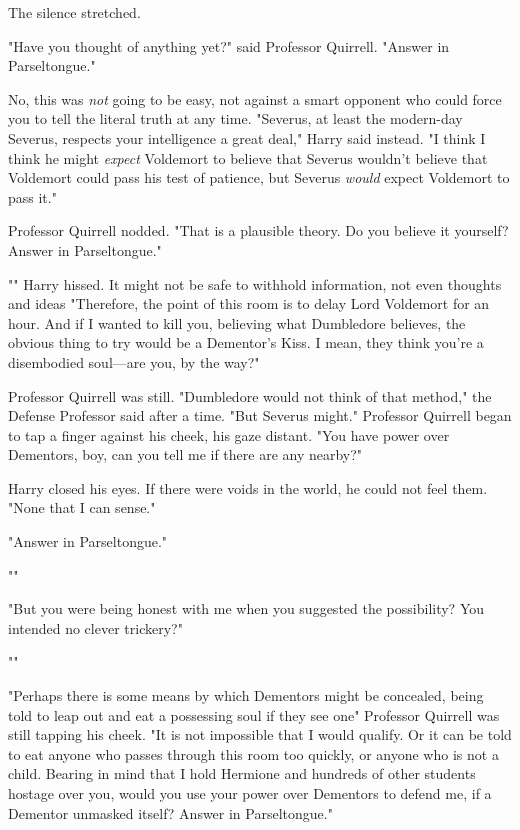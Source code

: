 The silence stretched.

"Have you thought of anything yet?" said Professor Quirrell. "Answer in
Parseltongue."

No, this was \emph{not} going to be easy, not against a smart opponent who
could force you to tell the literal truth at any time. "Severus, at least the
modern-day Severus, respects your intelligence a great deal," Harry said
instead. "I think{\el} I think he might \emph{expect} Voldemort to believe
that Severus wouldn't believe that Voldemort could pass his test of patience,
but Severus \emph{would} expect Voldemort to pass it."

Professor Quirrell nodded. "That is a plausible theory. Do you believe it
yourself? Answer in Parseltongue."

"" Harry hissed. It might not be safe to withhold information, not
even thoughts and ideas{\el} "Therefore, the point of this room is to delay
Lord Voldemort for an hour. And if I wanted to kill you, believing what
Dumbledore believes, the obvious thing to try would be a Dementor's Kiss. I
mean, they think you're a disembodied soul---are you, by the way?"

Professor Quirrell was still. "Dumbledore would not think of that method," the
Defense Professor said after a time. "But Severus might." Professor Quirrell
began to tap a finger against his cheek, his gaze distant. "You have power over
Dementors, boy, can you tell me if there are any nearby?"

Harry closed his eyes. If there were voids in the world, he could not feel
them. "None that I can sense."

"Answer in Parseltongue."

""

"But you were being honest with me when you suggested the possibility? You
intended no clever trickery?"

""

"Perhaps there is some means by which Dementors might be concealed, being told
to leap out and eat a possessing soul if they see one{\el}" Professor
Quirrell was still tapping his cheek. "It is not impossible that I would
qualify. Or it can be told to eat anyone who passes through this room too
quickly, or anyone who is not a child. Bearing in mind that I hold Hermione and
hundreds of other students hostage over you, would you use your power over
Dementors to defend me, if a Dementor unmasked itself? Answer in Parseltongue."

